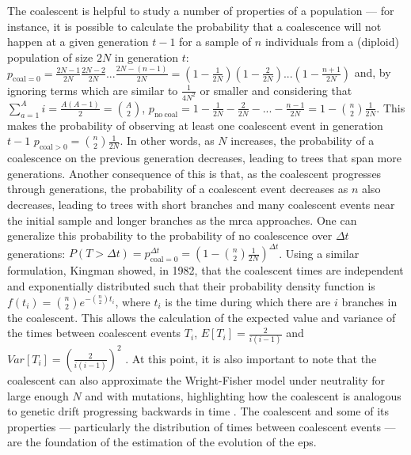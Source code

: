 The coalescent is helpful to study a number of properties of a population --- for instance, it is possible to calculate the probability that a coalescence will not happen at a given generation $t-1$ for a sample of $n$ individuals from a (diploid) population of size $2N$ in generation $t$: $p_{\mathrm{coal}=0} = \frac{2N-1}{2N}\frac{2N-2}{2N}...\frac{2N-(n-1)}{2N} = (1 - \frac{1}{2N})(1 - \frac{2}{2N})...(1 - \frac{n+1}{2N})$ and, by ignoring terms which are similar to $\frac{1}{4N^2}$ or smaller and considering that $\sum^A_{a=1}{i} = \frac{A(A-1)}{2} = \binom{A}{2}$, $p_{\mathrm{no\ coal}} = 1 - \frac{1}{2N} - \frac{2}{2N} -...- \frac{n-1}{2N} = 1 - \binom{n}{2}\frac{1}{2N}$. This makes the probability of observing at least one coalescent event in generation $t-1$ $p_{\mathrm{coal}>0} = \binom{n}{2}\frac{1}{2N}$. In other words, as $N$ increases, the probability of a coalescence on the previous generation decreases, leading to trees that span more generations. Another consequence of this is that, as the coalescent progresses through generations, the probability of a coalescent event decreases as $n$ also decreases, leading to trees with short branches and many coalescent events near the initial sample and longer branches as the \ac{mrca} approaches. One can generalize this probability to the probability of no coalescence over $\Delta t$ generations: $P(T > \Delta t) = p_{\mathrm{coal}=0}^{\Delta t} = (1-\binom{n}{2}\frac{1}{2N})^{\Delta t}$. Using a similar formulation, Kingman showed, in 1982, that the coalescent times are independent and exponentially distributed such that their probability density function is $f(t_i) = \binom{n}{2}e^{-\binom{n}{2}t_i}$, where $t_i$ is the time during which there are $i$ branches in the coalescent. This allows the calculation of the expected value and variance of the times between coalescent events $T_i$, $E[T_i] = \frac{2}{i(i-1)}$ and $Var[T_i] = (\frac{2}{i(i-1)})^2$ \cite{Kingman1982-tc}. At this point, it is also important to note that the coalescent can also approximate the Wright-Fisher model under neutrality for large enough $N$ and with mutations, highlighting how the coalescent is analogous to genetic drift progressing backwards in time \cite{Wakeley2008-wh}. The coalescent and some of its properties --- particularly the distribution of times between coalescent events --- are the foundation of the estimation of the evolution of the \ac{eps}.

